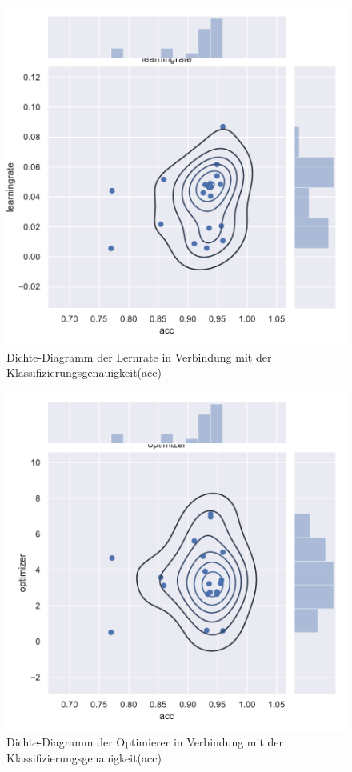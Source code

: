 \begin{figure}[H]
  \centering  
  \includegraphics[scale=0.5]{anhang/GA_50_mnist_digits_True_big_jointplot_learningrate.pdf}
  \caption{Dichte-Diagramm der Lernrate in Verbindung mit der Klassifizierungsgenauigkeit(acc)}
  
\end{figure}

\begin{figure}[H]
  \centering  
  \includegraphics[scale=0.5]{anhang/GA_50_mnist_digits_True_big_jointplot_optimizer.pdf}
  \caption{Dichte-Diagramm der Optimierer in Verbindung mit der Klassifizierungsgenauigkeit(acc)}
  
\end{figure}

